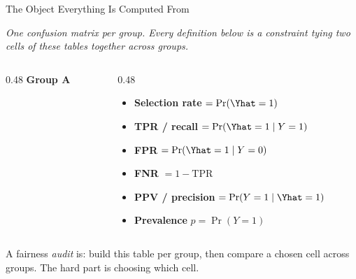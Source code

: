 \begin{frame}{The Object Everything Is Computed From}

    \centering
    \textit{One confusion matrix per group. Every definition below is a constraint tying two cells
    of these tables together across groups.}

    \vspace{0.6em}

    \begin{columns}[c]
        \begin{column}{0.48\textwidth}
            \centering \textbf{Group A}
        \end{column}
        \begin{column}{0.48\textwidth}
            \small
            \begin{itemize}
                \setlength\itemsep{0.45em}
                \item \textbf{Selection rate} $= \Pr(\Yhat = 1)$
                \item \textbf{TPR / recall} $= \Pr(\Yhat=1 \mid Y=1)$
                \item \textbf{FPR} $= \Pr(\Yhat=1 \mid Y=0)$
                \item \textbf{FNR} $= 1 - \text{TPR}$
                \item \textbf{PPV / precision} $= \Pr(Y=1 \mid \Yhat=1)$
                \item \textbf{Prevalence} $p = \Pr(Y=1)$
            \end{itemize}
        \end{column}
    \end{columns}

    \vspace{0.8em}
    \begin{block}{}
        \centering
        \small A fairness \emph{audit} is: build this table per group, then compare a chosen cell
        across groups. The hard part is choosing which cell.
    \end{block}
\end{frame}

